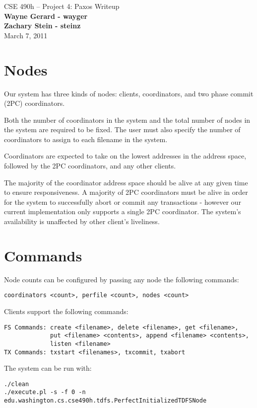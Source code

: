 \documentclass[11pt]{article}
\begin{document}
\begin{center}
{\large CSE 490h -- Project 4: Paxos Writeup} \\
\textbf{Wayne Gerard - wayger} \\
\textbf{Zachary Stein - steinz} \\
March 7, 2011
\end{center}

\section{Nodes}

Our system has three kinds of nodes: clients, coordinators, and two phase commit (2PC) coordinators.

Both the number of coordinators in the system and the total number of nodes in the system are required to be fixed.
The user must also specify the number of coordinators to assign to each filename in the system.

Coordinators are expected to take on the lowest addresses in the address space, followed by the 2PC coordinators, and any other clients.

The majority of the coordinator address space should be alive at any given time to ensure responsiveness. 
A majority of 2PC coordinators must be alive in order for the system to successfully abort or commit any transactions - 
however our current implementation only supports a single 2PC coordinator.
The system's availability is unaffected by other client's liveliness.

\section{Commands} 

Node counts can be configured by passing any node the following commands:
\begin{verbatim}
coordinators <count>, perfile <count>, nodes <count>
\end{verbatim}

Clients support the following commands:
\begin{verbatim}
FS Commands: create <filename>, delete <filename>, get <filename>, 
             put <filename> <contents>, append <filename> <contents>,
             listen <filename>
TX Commands: txstart <filenames>, txcommit, txabort
\end{verbatim}

The system can be run with:

\begin{verbatim}
./clean
./execute.pl -s -f 0 -n edu.washington.cs.cse490h.tdfs.PerfectInitializedTDFSNode
\end{verbatim}
\end{document}
